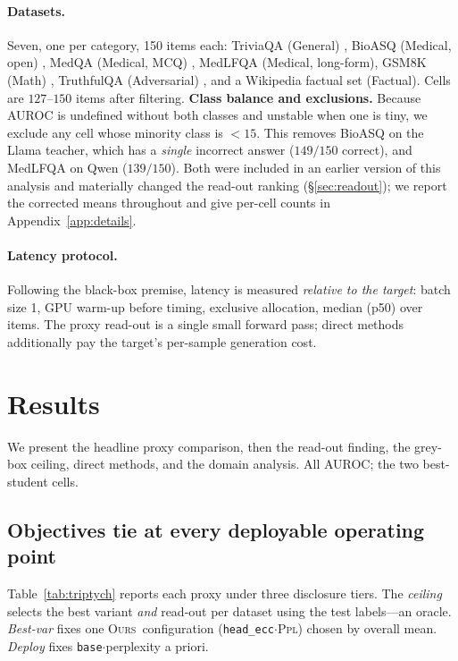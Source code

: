 \documentclass[11pt]{article}
\newcommand{\ours}{\textsc{Ours}}
\newcommand{\ppl}{\textsc{Ppl}}
\begin{document}
\paragraph{Datasets.} Seven, one per category, 150 items each: TriviaQA (General)
\citep{joshi2017triviaqa}, BioASQ (Medical, open) \citep{tsatsaronis2015bioasq}, MedQA
(Medical, MCQ) \citep{jin2021medqa}, MedLFQA (Medical, long-form), GSM8K (Math)
\citep{cobbe2021gsm8k}, TruthfulQA (Adversarial) \citep{lin2021truthfulqa}, and a
Wikipedia factual set (Factual). Cells are $127$--$150$ items after filtering.
\textbf{Class balance and exclusions.} Because AUROC is undefined without both classes and
unstable when one is tiny, we exclude any cell whose minority class is $<15$. This removes
BioASQ on the Llama teacher, which has a \emph{single} incorrect answer ($149/150$ correct),
and MedLFQA on Qwen ($139/150$). Both were included in an earlier version of this analysis and
materially changed the read-out ranking (\S\ref{sec:readout}); we report the corrected means
throughout and give per-cell counts in Appendix~\ref{app:details}.

\paragraph{Latency protocol.} Following the black-box premise, latency is measured
\emph{relative to the target}: batch size 1, GPU warm-up before timing, exclusive
allocation, median (p50) over items. The proxy read-out is a single small forward pass;
direct methods additionally pay the target's per-sample generation cost.

\section{Results}\label{sec:results}
We present the headline proxy comparison, then the read-out finding, the grey-box
ceiling, direct methods, and the domain analysis. All AUROC; the two best-student cells.

\subsection{Objectives tie at every deployable operating point}

Table~\ref{tab:triptych} reports each proxy under three disclosure tiers. The
\emph{ceiling} selects the best variant \emph{and} read-out per dataset using the test
labels---an oracle. \emph{Best-var} fixes one \ours\ configuration
(\texttt{head\_ecc}$\cdot$\ppl) chosen by overall mean. \emph{Deploy} fixes
\texttt{base}$\cdot$perplexity a priori.
\end{document}
